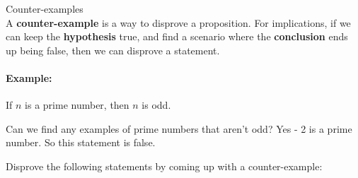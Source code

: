 \documentclass[a4paper,12pt]{book}
\newcounter{question}
\begin{document}
        \begin{intro}{Counter-examples} ~\\
            A \textbf{counter-example} is a way to disprove a proposition.
            For implications, if we can keep the \textbf{hypothesis} true,
            and find a scenario where the \textbf{conclusion} ends up being false,
            then we can disprove a statement.

            \paragraph{Example:}
            If $n$ is a prime number, then $n$ is odd.

            Can we find any examples of prime numbers that aren't odd?
            Yes - 2 is a prime number. So this statement is false.
        \end{intro}

        \begin{questionNOGRADE}{\thequestion}
            Disprove the following statements by coming up with a counter-example:

        \end{questionNOGRADE}
\end{document}
